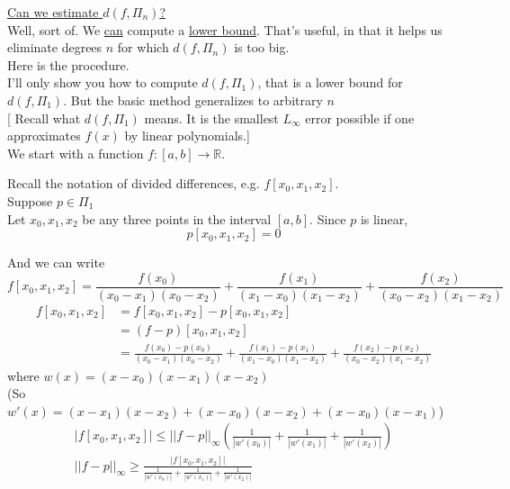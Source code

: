 {\underline{Can we estimate $d(f, \Pi_n)$?} \\

Well, sort of. We \underline{can} compute a \underline{lower bound}. That's useful, in that it helps us eliminate degrees $n$ for which $d(f, \Pi_n)$ is too big. \\

Here is the procedure. \\

I'll only show you how to compute $d(f, \Pi_1)$, that is a lower bound for $d(f, \Pi_1)$. But the basic method generalizes to arbitrary $n$ \\

[ Recall what $d(f, \Pi_1)$ means. It is the smallest $L_\infty$ error possible if one approximates $f(x)$ by linear polynomials.] \\

We start with a function $f: [a,b] \rightarrow \mathbb{R}$.

Recall the notation of divided differences, e.g. $f[x_0, x_1, x_2]$. \\

Suppose $p \in \Pi_1$ \\

Let $x_0, x_1, x_2$ be any three points in the interval $[a,b]$. Since $p$ is linear,
\begin{equation*}
    p[x_0, x_1, x_2] = 0
\end{equation*}

And we can write
\begin{equation*}
    f[x_0, x_1, x_2] = \frac{f(x_0)}{(x_0 - x_1)(x_0 - x_2)} + \frac{f(x_1)}{(x_1 - x_0)(x_1 - x_2)} + \frac{f(x_2)}{(x_0 - x_2)(x_1 - x_2)}
\end{equation*}
\begin{align*}
    f[x_0, x_1, x_2] &= f[x_0, x_1, x_2] - p[x_0, x_1, x_2] \\
    &= (f -p)[x_0, x_1, x_2] \\
    &= \frac{f(x_0) - p(x_0)}{(x_0 - x_1)(x_0 - x_2)} + \frac{f(x_1) - p(x_1)}{(x_1 - x_0)(x_1 - x_2)} + \frac{f(x_2) - p(x_2)}{(x_0 - x_2)(x_1 - x_2)}
\end{align*}
where $w(x) = (x - x_0)(x-x_1)(x-x_2)$ \\

(So $w'(x) = (x - x_1)(x - x_2) + (x - x_0)(x - x_2) + (x - x_0)(x - x_1)$) \\

\begin{align*}
    |f[x_0, x_1, x_2]| \leq ||f - p||_\infty \left( \frac{1}{|w'(x_0)|} + \frac{1}{|w'(x_1)|} + \frac{1}{|w'(x_2)|} \right) \\
    ||f - p||_\infty \geq \frac{|f[x_0, x_1, x_2]|}{\frac{1}{|w'(x_0)|} + \frac{1}{|w'(x_1)|} + \frac{1}{|w'(x_2)|}}
\end{align*}

}
